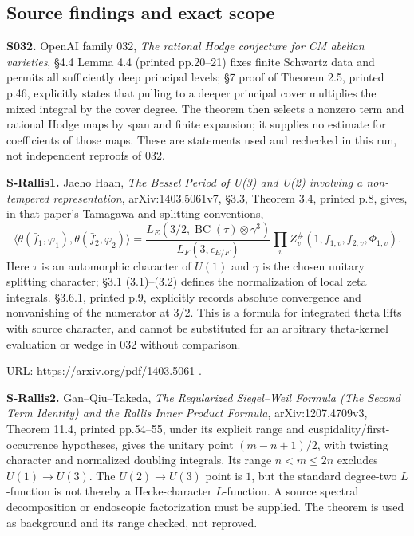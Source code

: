 \documentclass[11pt,a4paper]{article}
\theoremstyle{definition}
\begin{document}
\subsection{Source findings and exact scope}\label{source-findings-and-exact-scope}

\textbf{S032.} OpenAI family 032, \emph{The rational Hodge conjecture for CM abelian varieties}, §4.4 Lemma 4.4 (printed pp.20--21) fixes finite Schwartz data and permits all sufficiently deep principal levels; §7 proof of Theorem 2.5, printed p.46, explicitly states that pulling to a deeper principal cover multiplies the mixed integral by the cover degree. The theorem then selects a nonzero term and rational Hodge maps by span and finite expansion; it supplies no estimate for coefficients of those maps. These are statements used and rechecked in this run, not independent reproofs of 032.

\textbf{S-Rallis1.} Jaeho Haan, \emph{The Bessel Period of U(3) and U(2) involving a non-tempered representation}, arXiv:1403.5061v7, §3.3, Theorem 3.4, printed p.8, gives, in that paper's Tamagawa and splitting conventions, \[
\langle\theta(\bar f_1,\varphi_1),\theta(\bar f_2,\varphi_2)\rangle
 = \frac{L_E(3/2,\operatorname{BC}(\tau)\otimes\gamma^3)}{L_F(3,\epsilon_{E/F})}
 \prod_v Z_v^{\#}(1,f_{1,v},f_{2,v},\Phi_{1,v}).
\] Here \(\tau\) is an automorphic character of \(U(1)\) and \(\gamma\) is the chosen unitary splitting character; §3.1 (3.1)--(3.2) defines the normalization of local zeta integrals. §3.6.1, printed p.9, explicitly records absolute convergence and nonvanishing of the numerator at \(3/2\). This is a formula for integrated theta lifts with source character, and cannot be substituted for an arbitrary theta-kernel evaluation or wedge in 032 without comparison.

URL: https://arxiv.org/pdf/1403.5061 .

\textbf{S-Rallis2.} Gan--Qiu--Takeda, \emph{The Regularized Siegel--Weil Formula (The Second Term Identity) and the Rallis Inner Product Formula}, arXiv:1207.4709v3, Theorem 11.4, printed pp.54--55, under its explicit range and cuspidality/first-occurrence hypotheses, gives the unitary point \((m-n+1)/2\), with twisting character and normalized doubling integrals. Its range \(n<m\leq2n\) excludes \(U(1)\to U(3)\). The \(U(2)\to U(3)\) point is \(1\), but the standard degree-two \(L\)-function is not thereby a Hecke-character \(L\)-function. A source spectral decomposition or endoscopic factorization must be supplied. The theorem is used as background and its range checked, not reproved.
\end{document}
